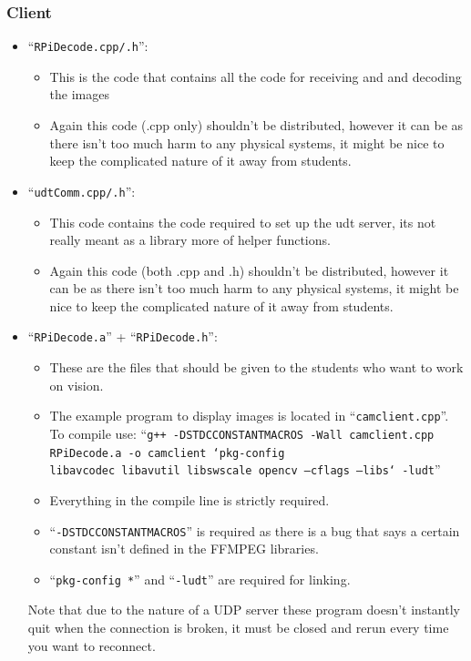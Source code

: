 \documentclass{article}
\begin{document}
\subsubsection{Client}
\begin{itemize}
    \item ``{\tt RPiDecode.cpp/.h}'':
    \begin{itemize}
        \item This is the code that contains all the code for receiving and and decoding the images
        \item Again this code (.cpp only) shouldn't be distributed, however it can be as there isn't too much harm to any physical systems, it might be nice to keep the complicated nature of it away from students.
    \end{itemize}
    \item ``{\tt udtComm.cpp/.h}'':
    \begin{itemize}
        \item This code contains the code required to set up the udt server, its not really meant as a library more of helper functions.
        \item Again this code (both .cpp and .h) shouldn't be distributed, however it can be as there isn't too much harm to any physical systems, it might be nice to keep the complicated nature of it away from students.
    \end{itemize}
    \item ``{\tt RPiDecode.a}'' + ``{\tt RPiDecode.h}'':
    \begin{itemize}
        \item These are the files that should be given to the students who want to work on vision. 
        \item The example program to display images is located in ``{\tt camclient.cpp}''. To compile use: ``{\tt g++ -D\textunderscore \textunderscore STDC\textunderscore CONSTANT\textunderscore MACROS -Wall camclient.cpp RPiDecode.a -o camclient `pkg-config \\ libavcodec libavutil libswscale opencv --cflags --libs` -ludt}''
        \item Everything in the compile line is strictly required.
        \item ``{\tt -D\textunderscore \textunderscore STDC\textunderscore CONSTANT\textunderscore MACROS}'' is required as there is a bug that says a certain constant isn't defined in the FFMPEG libraries.
        \item ``{\tt pkg-config *}'' and ``{\tt -ludt}'' are required for linking.
    \end{itemize}

    Note that due to the nature of a UDP server these program doesn't instantly quit when the connection is broken, it must be closed and rerun every time you want to reconnect.
\end{itemize}
\end{document}
